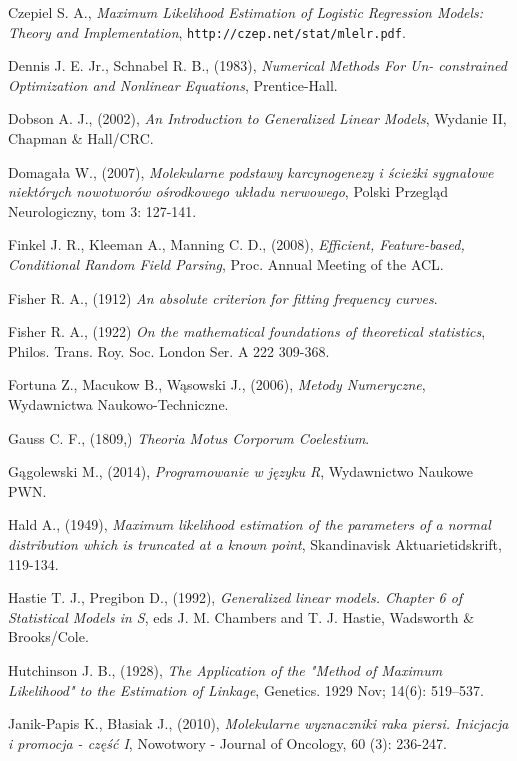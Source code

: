 \begin{thebibliography}{99}
 Czepiel S. A., \textit{Maximum Likelihood Estimation of Logistic Regression Models: Theory and Implementation}, \texttt{http://czep.net/stat/mlelr.pdf}.

 Dennis J. E. Jr., Schnabel R. B., (1983), \textit{Numerical Methods For Un-
constrained Optimization and Nonlinear Equations}, Prentice-Hall.

 Dobson A. J., (2002), \textit{An Introduction to Generalized Linear Models}, Wydanie II, Chapman \& Hall/CRC.

 Domagała W., (2007), \textit{Molekularne podstawy karcynogenezy i ścieżki sygnałowe niektórych nowotworów ośrodkowego układu nerwowego}, Polski Przegląd Neurologiczny, tom 3: 127-141.

  Finkel J. R., Kleeman A., Manning C. D., (2008), \textit{Efficient, Feature-based, Conditional Random Field Parsing}, Proc. Annual Meeting of the ACL.

 Fisher R. A., (1912) \textit{An absolute criterion for fitting frequency curves}. 

 Fisher R. A., (1922) \textit{On the mathematical foundations of theoretical statistics}, Philos. Trans. Roy. Soc. London Ser. A 222 309-368.

 Fortuna Z., Macukow B., Wąsowski J., (2006), \textit{Metody Numeryczne}, Wydawnictwa Naukowo-Techniczne.

 Gauss C. F., (1809,) \textit{Theoria Motus Corporum Coelestium}.

 Gągolewski M., (2014), \textit{Programowanie w języku R}, Wydawnictwo Naukowe PWN.


 Hald A., (1949), \textit{Maximum likelihood estimation of the parameters of a normal distribution which is truncated at a known point}, Skandinavisk Aktuarietidskrift, 119-134.


 Hastie T. J., Pregibon D., (1992), \textit{Generalized linear models. Chapter 6 of Statistical Models in S}, eds J. M. Chambers and T. J. Hastie, Wadsworth \& Brooks/Cole.


 Hutchinson J. B., (1928), \textit{The Application of the "Method of Maximum Likelihood" to the Estimation of Linkage}, Genetics. 1929 Nov; 14(6): 519–537.


 Janik-Papis K., Błasiak J., (2010), \textit{Molekularne wyznaczniki raka piersi. Inicjacja i promocja - część I}, Nowotwory - Journal of Oncology, 60 (3): 236-247.


\end{thebibliography}
